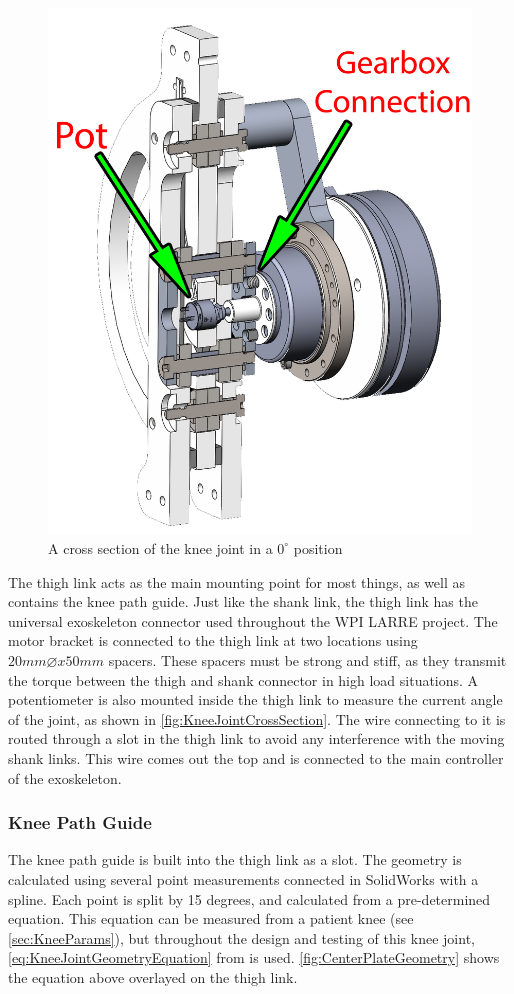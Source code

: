 \begin{figure}[ht!]
    \centering
    \includegraphics[width=0.7\linewidth]{Figures/Design/KneeJointAssyCrossSection_edit.png}
    \caption{A cross section of the knee joint in a \(0^\circ\) position}
    \label{fig:KneeJointCrossSection}
\end{figure}

The thigh link acts as the main mounting point for most things, as well as contains the knee path guide. Just like the shank link, the thigh link has the universal exoskeleton connector used throughout the WPI LARRE project. The motor bracket is connected to the thigh link at two locations using \(20mm\diameter x 50mm\) spacers. These spacers must be strong and stiff, as they transmit the torque between the thigh and shank connector in high load situations. A potentiometer is also mounted inside the thigh link to measure the current angle of the joint, as shown in \autoref{fig:KneeJointCrossSection}. The wire connecting to it is routed through a slot in the thigh link to avoid any interference with the moving shank links. This wire comes out the top and is connected to the main controller of the exoskeleton.

\subsubsection{Knee Path Guide}
The knee path guide is built into the thigh link as a slot. The geometry is calculated using several point measurements connected in SolidWorks with a spline. Each point is split by 15 degrees, and calculated from a pre-determined equation. This equation can be measured from a patient knee (see \autoref{sec:KneeParams}), but throughout the design and testing of this knee joint, \autoref{eq:KneeJointGeometryEquation} from \cite{KinDynKneeJoint} is used. \autoref{fig:CenterPlateGeometry} shows the equation above overlayed on the thigh link.

